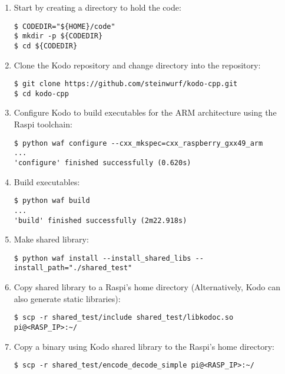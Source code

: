 \begin{enumerate}

\item Start by creating a directory to hold the code:
\begin{lstlisting}[]
$ CODEDIR="${HOME}/code"
$ mkdir -p ${CODEDIR}
$ cd ${CODEDIR}
\end{lstlisting}
\FloatBarrier
\vspace{-5mm}

\item Clone the Kodo repository and change directory into the repository:
\begin{lstlisting}[]
$ git clone https://github.com/steinwurf/kodo-cpp.git
$ cd kodo-cpp
\end{lstlisting}
\FloatBarrier
\vspace{-5mm}

\item Configure Kodo to build executables for the \ac{ARM} architecture using the \ac{Raspi} toolchain:
\begin{lstlisting}[]
$ python waf configure --cxx_mkspec=cxx_raspberry_gxx49_arm
...
'configure' finished successfully (0.620s)
\end{lstlisting}
\FloatBarrier
\vspace{-5mm}

\item Build executables:
\begin{lstlisting}[]
$ python waf build
...
'build' finished successfully (2m22.918s)
\end{lstlisting}
\FloatBarrier
\vspace{-5mm}


\item Make shared library:
\begin{lstlisting}[]
$ python waf install --install_shared_libs --install_path="./shared_test"
\end{lstlisting}
\FloatBarrier
\vspace{-5mm}

\item Copy shared library to a \ac{Raspi}'s home directory (Alternatively, Kodo can also generate static libraries):
\begin{lstlisting}[]
$ scp -r shared_test/include shared_test/libkodoc.so pi@<RASP_IP>:~/
\end{lstlisting}
\FloatBarrier
\vspace{-5mm}

\item Copy a binary using Kodo shared library to the \ac{Raspi}'s home directory:
\begin{lstlisting}[]
$ scp -r shared_test/encode_decode_simple pi@<RASP_IP>:~/
\end{lstlisting}
\FloatBarrier
\vspace{-5mm}


\end{enumerate}
